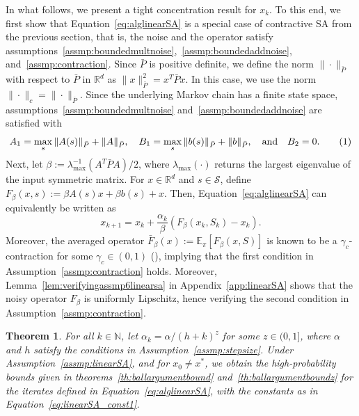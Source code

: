 \documentclass{article}
\newcommand{\numberthis}{\addtocounter{equation}{1}\tag{\theequation}}
\newcommand{\lrp}[1]{\left( #1 \right)}
\newcommand{\lrs}[1]{\left[ #1 \right]}
\newcommand{\Exp}[2]{\mathbb{E}_{#1}\lrs{#2}}
\newcommand{\R}{\mathbb{R}}
\newcommand{\N}{\mathbb{N}}
\newcommand{\calS}{{\mathcal S}}
\newcommand{\xk}{x_k}
\newtheorem{theorem}{Theorem}[section]
\begin{document}
\medskip

In what follows, we present a tight concentration result for $\xk$. To this end, we first show that Equation~\eqref{eq:alglinearSA} is a special case of contractive SA from the previous section, that is, the noise and the operator satisfy assumptions~\ref{assmp:boundedmultnoise},~\ref{assmp:boundedaddnoise}, and~\ref{assmp:contraction}. Since $\bar{P}$ is positive definite, we define the norm $\|\cdot\|_{\bar{P}}$ with respect to $\bar{P}$ in $\R^d$ as $\|x\|^2_{\bar{P}} = x^T \bar{P} x$. In this case, we use the norm $\|\cdot\|_c = \|\cdot\|_{\bar{P}}$. Since the underlying Markov chain has a finite state space, assumptions~\ref{assmp:boundedmultnoise} and~\ref{assmp:boundedaddnoise} are satisfied with 
\[A_1 = \max_s\|A(s)\|_{\bar{P}} + \|A\|_{\bar{P}}, \quad B_1 = \max_s \|b(s)\|_{\bar{P}} + \|b\|_{\bar{P}},\quad \text{and}\quad B_2 = 0. \numberthis\label{eq:linearSA_const1} \] 
Next, let $\beta := \lambda^{-1}_{\max}(A^T\bar{P}A)/2$, where $\lambda_{\max}(\cdot)$ returns the largest eigenvalue of the input symmetric matrix. For $x\in\R^d$ and $s\in\calS$, define $F_\beta(x,s):= \beta A(s) x + \beta b(s) + x$. Then, Equation~\eqref{eq:alglinearSA} can equivalently be written as
\[ x_{k+1} = x_k + \frac{\alpha_k}{\beta} \lrp{ F_{\beta}(x_k, S_k) - x_k }. \]
Moreover, the averaged operator $\bar{F}_\beta(x) := \Exp{\pi}{F_\beta(x,S)}$ is known to be a $\gamma_c$-contraction for some $\gamma_c \in (0,1)$ (\citet[Proposition 3.1]{chen2025concentration}), implying that the first condition in Assumption~\ref{assmp:contraction} holds. Moreover,  Lemma~\ref{lem:verifyingassmp6linearsa} in Appendix~\ref{app:linearSA} shows that the noisy operator $F_\beta$ is uniformly Lipschitz, hence verifying the second condition in Assumption~\ref{assmp:contraction}. 


\begin{theorem}\label{th:linearSAconc}
    For all $k\in\N$, let $\alpha_k = \alpha/(h+k)^z$ for some $z\in(0,1]$, where $\alpha$ and $h$ satisfy the conditions in Assumption~\ref{assmp:stepsize}. Under Assumption~\ref{assmp:linearSA}, and for $x_0 \ne x^*$, we obtain the high-probability bounds given in theorems~\ref{th:ballargumentbound} and~\ref{th:ballargumentboundz} for the iterates defined in Equation~\eqref{eq:alglinearSA}, with the constants as in Equation~\eqref{eq:linearSA_const1}.
\end{theorem}
\end{document}
